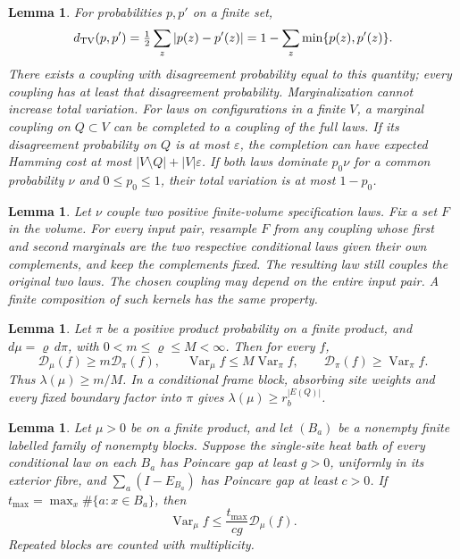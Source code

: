 \documentclass[11pt,reqno]{amsart}
\newtheorem{lemma}[theorem]{Lemma}
\theoremstyle{definition}
\theoremstyle{remark}
\begin{document}
\begin{lemma}\label{l:finitecoupling}
For probabilities \(p,p'\) on a finite set,
\[
 d_{\rm TV}(p,p')=\tfrac12\sum_z|p(z)-p'(z)|
          =1-\sum_z\min\{p(z),p'(z)\}.
\]
There exists a coupling with disagreement probability equal to this
quantity; every coupling has at least that disagreement probability.
Marginalization cannot increase total variation.
For laws on configurations in a finite \(V\), a marginal coupling
on \(Q\subset V\) can be completed to a coupling of the full laws.
If its disagreement probability on \(Q\) is at most \(\varepsilon\),
the completion can have expected Hamming cost at most
\(|V\setminus Q|+|V|\varepsilon\).
If both laws dominate \(p_0\nu\) for a common probability \(\nu\)
and \(0\le p_0\le1\), their total variation is at most \(1-p_0\).
\end{lemma}

\begin{lemma}\label{l:surgery}
Let \(\nu\) couple two positive finite-volume specification laws.
Fix a set \(F\) in the volume. For every input pair, resample \(F\)
from any coupling whose first and second marginals are the two
respective conditional laws given their own complements, and keep
the complements fixed. The resulting law still couples the original
two laws. The chosen coupling may depend on the entire input pair.
A finite composition of such kernels has the same property.
\end{lemma}

\begin{lemma}\label{l:density}
Let \(\pi\) be a positive product probability on a finite product,
and \(d\mu=\varrho\,d\pi\), with \(0<m\le\varrho\le M<\infty\).
Then for every \(f\),
\[
 \mathcal D_\mu(f)\ge m\mathcal D_\pi(f),\qquad
 \operatorname{Var}_\mu f\le M\operatorname{Var}_\pi f,\qquad
 \mathcal D_\pi(f)\ge\operatorname{Var}_\pi f .
\]
Thus \(\lambda(\mu)\ge m/M\).
In a conditional frame block, absorbing site weights and every
fixed boundary factor into \(\pi\) gives
\(\lambda(\mu)\ge r_b^{|E(Q)|}\).
\end{lemma}

\begin{lemma}\label{l:comparison}
Let \(\mu>0\) be on a finite product, and let \((B_a)\) be a
nonempty finite labelled family of nonempty blocks.
Suppose the single-site heat bath of every conditional law on each
\(B_a\) has Poincare gap at least \(g>0\), uniformly in its exterior fibre,
and \(\sum_a(I-E_{B_a})\) has Poincare gap at least \(c>0\).
If \(t_{\max}=\max_x\#\{a:x\in B_a\}\), then
\[
 \operatorname{Var}_\mu f\le
             \frac{t_{\max}}{cg}\mathcal D_\mu(f).
\]
Repeated blocks are counted with multiplicity.
\end{lemma}
\end{document}
